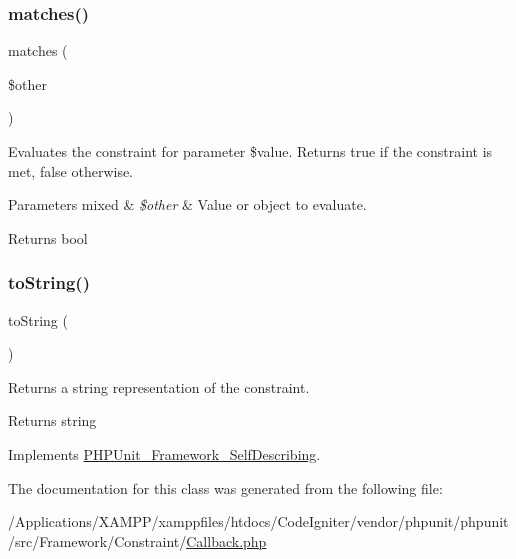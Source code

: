 \subsubsection{\texorpdfstring{matches()}{matches()}}
{\footnotesize\ttfamily matches (\begin{DoxyParamCaption}\item[{}]{\$other }\end{DoxyParamCaption})\hspace{0.3cm}{\ttfamily [protected]}}

Evaluates the constraint for parameter \$value. Returns true if the constraint is met, false otherwise.


\begin{DoxyParams}[1]{Parameters}
mixed & {\em \$other} & Value or object to evaluate.\\
\hline
\end{DoxyParams}
\begin{DoxyReturn}{Returns}
bool 
\end{DoxyReturn}
\mbox{\label{class_p_h_p_unit___framework___constraint___callback_a5558c5d549f41597377fa1ea8a1cefa3}} 
\subsubsection{\texorpdfstring{to\+String()}{toString()}}
{\footnotesize\ttfamily to\+String (\begin{DoxyParamCaption}{ }\end{DoxyParamCaption})}

Returns a string representation of the constraint.

\begin{DoxyReturn}{Returns}
string 
\end{DoxyReturn}


Implements \mbox{\hyperlink{interface_p_h_p_unit___framework___self_describing_a5558c5d549f41597377fa1ea8a1cefa3}{P\+H\+P\+Unit\+\_\+\+Framework\+\_\+\+Self\+Describing}}.



The documentation for this class was generated from the following file\+:\begin{DoxyCompactItemize}
\item 
/\+Applications/\+X\+A\+M\+P\+P/xamppfiles/htdocs/\+Code\+Igniter/vendor/phpunit/phpunit/src/\+Framework/\+Constraint/\mbox{\hyperlink{_callback_8php}{Callback.\+php}}\end{DoxyCompactItemize}
